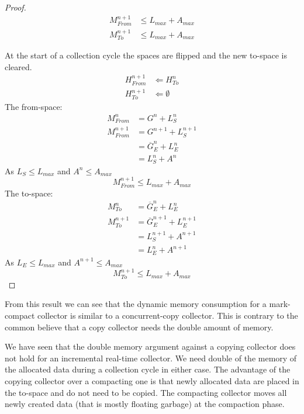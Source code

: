 \begin{proof}
\begin{align}
\nonumber
    M_{From}^{n+1} & \le L_{max} + A_{max}\\
    M_{To}^{n+1}   & \le L_{max} + A_{max}
\end{align}



At the start of a collection cycle the spaces are flipped and the
new to-space is cleared.
%
\begin{align}
\nonumber
    H_{From}^{n+1} & \Leftarrow H_{To}^n\\
    H_{To}^{n+1}   & \Leftarrow \emptyset
\end{align}
%
The from-space:
%
\begin{align}
    M_{From}^{n}  & = G^n + L_S^n\\
    M_{From}^{n+1} & = G^{n+1} + L_S^{n+1}\\
\nonumber
                   & = \overline{G}_E^n + L_E^n\\
                   & = L_S^n + A^n
\end{align}
%
As $L_S \le L_{max}$ and $A^n \le A_{max}$
%
\begin{equation}
    M_{From}^{n+1} \le L_{max} + A_{max}
\end{equation}
%
The to-space:
%
\begin{align}
    M_{To}^{n}     & = \overline{G}_E^n + L_E^n\\
    M_{To}^{n+1}   & = \overline{G}_E^{n+1} + L_E^{n+1}\\
\nonumber
                   & = L_S^{n+1} + A^{n+1}\\
                   & = L_E^{n} + A^{n+1}
\end{align}
%
%
As $L_E \le L_{max}$ and $A^{n+1} \le A_{max}$
%
\begin{equation}
    M_{To}^{n+1} \le L_{max} + A_{max}
\end{equation}
%
\end{proof}

From this result we can see that the dynamic memory consumption for
a mark-compact collector is similar to a concurrent-copy collector.
This is contrary to the common believe that a copy collector needs
the double amount of memory.

We have seen that the double memory argument against a copying
collector does not hold for an incremental real-time collector. We
need double of the memory of the allocated data during a collection
cycle in either case. The advantage of the copying collector over a
compacting one is that newly allocated data are placed in the
to-space and do not need to be copied. The compacting collector
moves all newly created data (that is mostly floating garbage) at
the compaction phase.

